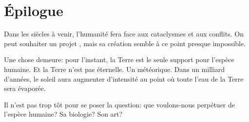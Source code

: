 \chapter*{Épilogue}

Dans les siècles à venir, l'humanité fera face aux cataclysmes et aux conflits.
On peut souhaiter un projet \nomProjet{}, mais sa création semble à ce point
presque impossible.

Une chose demeure: pour l'instant, la Terre est le seule support pour l'espèce humaine.
Et la Terre n'est pas éternelle. Un météorique. Dans un milliard d'années, le soleil aura 
augmenter d'intensité au point où toute l'eau de la Terre sera évaporée.

Il n'est pas trop tôt pour se poser la question: que voulons-nous perpétuer de l'espèce humaine?
Sa biologie? Son art?
